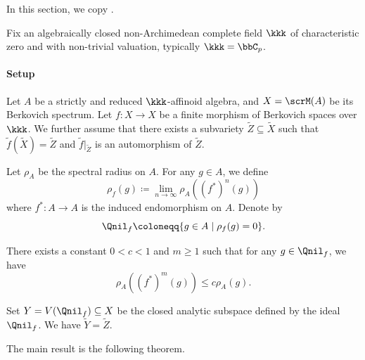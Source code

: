     In this section, we copy \cite[Appendix A]{Xie-2025-ExistenceZariskiDense}.

    Fix an algebraically closed non-Archimedean complete field \(\kkk\) of characteristic zero and with non-trivial valuation, typically \(\kkk = \bbC_p\).

    \paragraph{Setup} Let \(A\) be a strictly and reduced \(\kkk\)-affinoid algebra, and \(X = \scrM(A)\) be its Berkovich spectrum.
    Let \(f: X \to X\) be a finite morphism of Berkovich spaces over \(\kkk\).
    We further assume that there exists a subvariety \(\tilde{Z} \subseteq \tilde{X}\) such that \(\tilde{f}(\tilde{X}) = \tilde{Z}\) and \(\tilde{f}|_{\tilde{Z}}\) is an automorphism of \(\tilde{Z}\).


    \begin{definition}\label{def:f_spectral_radius_and_quasinilpotent_ideal}
        Let \(\rho_A\) be the spectral radius on \(A\).
        For any \(g \in A\), we define
        \[ \rho_f(g) \coloneqq \lim_{n \to \infty} \rho_A\left( (f^*)^n(g) \right) \]
        where \(f^*: A \to A\) is the induced endomorphism on \(A\).
        Denote by
        \[ \Qnil_f \coloneqq \{ g \in A \mid \rho_f(g) = 0 \}. \]
    \end{definition}

    \begin{proposition}\label{prop:uniformly_converge_on_quinilpotent_ideal}
        There exists a constant \(0 < c < 1\) and \(m \geq 1\) such that for any \(g \in \Qnil_f\), we have
        \[ \rho_A\left( (f^*)^{m}(g) \right) \leq c \rho_A(g). \]
    \end{proposition}

    \begin{proposition}\label{prop:Y_is_Z_after_reduction}
        Set \(Y = V(\Qnil_f) \subseteq X\) be the closed analytic subspace defined by the ideal \(\Qnil_f\).
        We have \(\tilde{Y} = \tilde{Z}\).
    \end{proposition}

    The main result is the following theorem.

